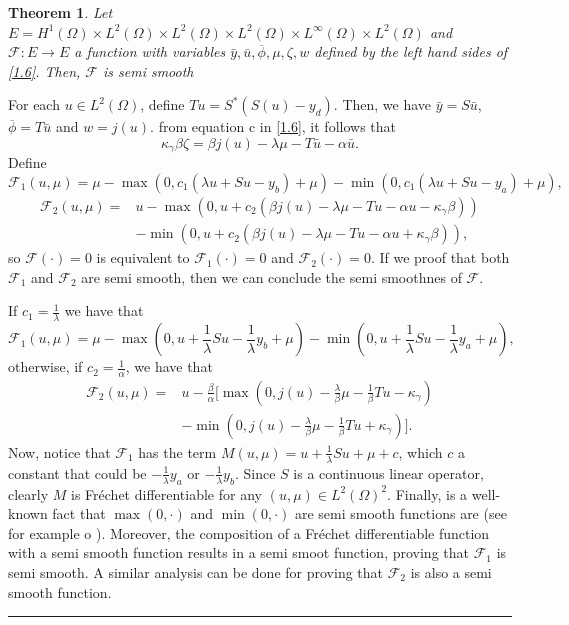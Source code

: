 \documentclass[11pt,a4paper]{amsart}
\newcommand{\kw}{\rule{2mm}{2mm}}
\renewcommand{\l}{\left}
\renewcommand{\r}{\right}
\newcommand{\om}{\Omega}
\renewenvironment{proof}{{Proof.}}{\hfill\kw}
\newtheorem{theorem}{{Theorem}}
\begin{document}
\begin{theorem}
\normalfont
    Let $E=H^1(\om)\times L^{2}(\om)\times L^{2}(\om)\times L^{2}(\om)\times L^{\infty}(\om)\times L^{2}(\om)$ and $\mathcal{F}: E\to E$ a function with variables $\bar{y},\bar{u},\overline{\phi},\mu,\zeta,w$ defined by the left hand sides of \eqref{1.6}. Then, $\mathcal{F}$ is semi smooth
\end{theorem}
\begin{proof}
For each $u \in L^2(\om)$, define $Tu=S^*(S(u)-y_d)$. Then, we have $\bar{y}=S\bar{u}$, $\overline{\phi}=T\bar{u}$ and $w=j(u)$. from equation c in \eqref{1.6}, it follows that
\[
    \kappa_{\gamma}\beta\zeta=\beta j(u)-\lambda \mu-T\bar{u}-\alpha\bar{u}.
\]
Define 
\[
    \mathcal{F}_1(u,\mu)=\mu-\max(0,c_1(\lambda u+Su-y_b)+\mu)-\min(0,c_1(\lambda u+Su-y_a)+\mu),
\]
\begin{align*}
    \mathcal{F}_2(u,\mu)=&u-\max(0,u+c_2(\beta j(u)-\lambda\mu-Tu-\alpha u-\kappa_{\gamma}\beta))\\
    &-\min(0,u+c_2(\beta j(u)-\lambda\mu-Tu-\alpha u+\kappa_{\gamma}\beta)),
\end{align*}
so $\mathcal{F}(\cdot)=0$ is equivalent to $\mathcal{F}_1(\cdot)=0$ and $\mathcal{F}_2(\cdot)=0$. If we proof that both $\mathcal{F}_1$ and $   \mathcal{F}_2$ are semi smooth, then we can conclude the semi smoothnes of $\mathcal{F}$.


If $c_1=\frac{1}{\lambda}$ we have that
\[
    \mathcal{F}_1(u,\mu)=\mu-\max\l(0,u+\frac{1}{\lambda}Su-\frac{1}{\lambda} y_b+\mu\r)-\min\l(0,u+\frac{1}{\lambda}Su-\frac{1}{\lambda}y_a+\mu\r),
\]
otherwise, if  $c_2=\frac{1}{\alpha}$, we have that
\begin{align*}
    \mathcal{F}_2(u,\mu)=&u-\frac{\beta}{\alpha}\bigg[\max\l(0,j(u)-\frac{\lambda }{\beta}\mu-\frac{1}{\beta}Tu-\kappa_{\gamma}\r)\\
    &-\min\l(0,j(u)-\frac{\lambda }{\beta}\mu-\frac{1}{\beta}Tu+\kappa_{\gamma}\r)\bigg].
\end{align*}
Now, notice that $\mathcal{F}_1$ has the term $M(u,\mu)=u+\frac{1}{\lambda}Su+\mu+c$, which $c$ a constant that could be $-\frac{1}{\lambda}y_a$ or $-\frac{1}{\lambda}y_b$. Since $S$ is a continuous linear operator, clearly $M$ is Fréchet differentiable for any $(u,\mu)\in L^2(\om)^2$. Finally, is a well-known fact that $\max(0,\cdot)$ and $\min(0,\cdot)$ are semi smooth functions are (see for example \cite{delosreyes} o \cite{ito-kunish}). Moreover, the composition of a Fréchet differentiable function with a semi smooth function results in a semi smoot function, proving that $\mathcal{F}_1$ is semi smooth. A similar analysis can be done for proving that $\mathcal{F}_2$ is also a semi smooth function. 
\end{proof}\\
\end{document}
